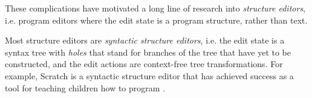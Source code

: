 

These complications have motivated a long line of research into \emph{structure editors}, i.e. program editors where the edit state is a  program structure, rather than text. %

Most structure editors are \emph{syntactic structure editors}, i.e. the edit state is a syntax tree with \emph{holes} that stand for branches of the tree that have yet to be constructed, and the edit actions are context-free tree transformations. For example, Scratch is a syntactic structure editor that has achieved success as a tool for teaching children how to program \cite{Resnick:2009:SP:1592761.1592779}. 

